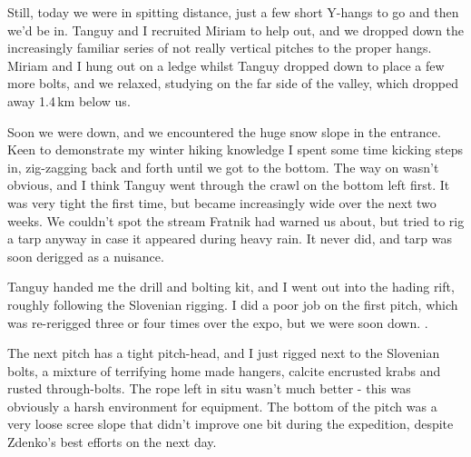 Still, today we were in spitting distance, just a few short Y-hangs to go and then we'd be in. Tanguy and I recruited Miriam to help out, and we dropped down the increasingly familiar series of not really vertical pitches to the proper hangs. Miriam and I hung out on a ledge whilst Tanguy dropped down to place a few more bolts, and we relaxed, studying  on the far side of the  valley, which dropped away 1.4\,km below us.


Soon we were down, and we encountered the huge snow slope in the entrance. Keen to demonstrate my winter hiking knowledge I spent some time kicking steps in, zig-zagging back and forth until we got to the bottom. The way on wasn't obvious, and I think Tanguy went through the crawl on the bottom left first. It was very tight the first time, but became increasingly wide over the next two weeks. We couldn't spot the stream Fratnik had warned us about, but tried to rig a tarp anyway in case it appeared during heavy rain. It never did, and tarp was soon derigged as a nuisance.

Tanguy handed me the drill and bolting kit, and I went out into the hading rift, roughly following the Slovenian rigging. I did a poor job on the first pitch, which was re-rerigged three or four times over the expo, but we were soon down. .

The next pitch has a tight pitch-head, and I just rigged next to the Slovenian bolts, a mixture of terrifying home made hangers, calcite encrusted krabs and rusted through-bolts. The rope left in situ wasn't much better - this was obviously a harsh environment for equipment. The bottom of the pitch was a very loose scree slope that didn't improve one bit during the expedition, despite Zdenko's best efforts on the next day.

